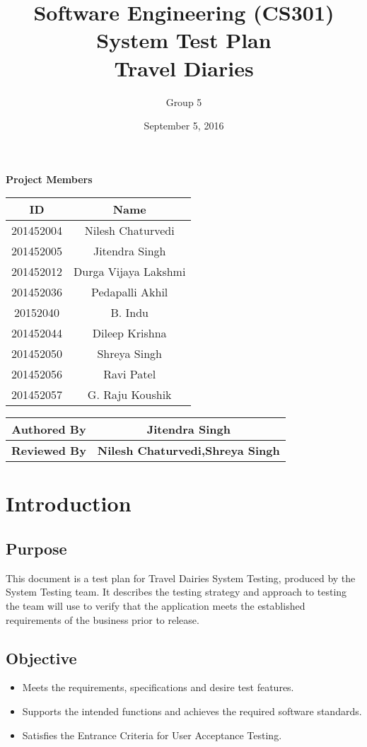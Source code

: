 \documentclass[]{article}
\title{Software Engineering (CS301)\\ System Test Plan\\Travel Diaries}
\author{Group 5}
\date{September 5, 2016}
\begin{document}
\maketitle


\begin{center}
\textbf{Project Members}\\
\vspace*{.6cm}
\begin{tabular}{|c|c|}
\hline
\textbf{ID} & \textbf{Name}\\
\hline
\hline
201452004 & Nilesh Chaturvedi\\
\hline
201452005 & Jitendra Singh\\
\hline
201452012 & Durga Vijaya Lakshmi\\
\hline
201452036 & Pedapalli Akhil\\
\hline
20152040 & B. Indu\\
\hline
201452044 & Dileep Krishna\\
\hline
201452050 & Shreya Singh\\
\hline
201452056 & Ravi Patel\\
\hline
201452057 & G. Raju Koushik\\
\hline
\end{tabular}

\vspace*{1cm}

\begin{tabular}{|c|c|}
\hline
\textbf{Authored By} & \textbf{Jitendra Singh}\\
\hline
\textbf{Reviewed By} & \textbf{Nilesh Chaturvedi,Shreya Singh}\\
\hline
\end{tabular}
\end{center}

\newpage
\tableofcontents
\newpage


\section{Introduction}
\subsection{Purpose}
This document is a test plan for Travel Dairies  System Testing, produced by the System Testing team.  It describes the testing strategy and approach to testing the team will use to verify that the application meets the established requirements of the business prior to release.
\subsection{Objective}
\begin{itemize}
\item Meets the requirements, specifications and desire test features.
\item Supports the intended functions and achieves the required software standards.
\item Satisfies the Entrance Criteria for User Acceptance Testing.
\end{itemize}
\end{document}
